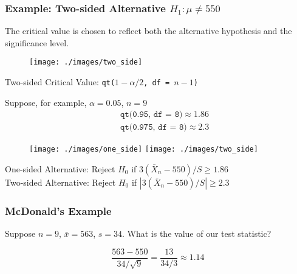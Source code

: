 \documentclass{beamer}
\begin{document}

\begin{frame}
\frametitle{Example: Two-sided Alternative $H_1\colon \mu \neq 550$}
The critical value is chosen to reflect both the alternative hypothesis and the significance level. 
\begin{figure}
\texttt{[image: ./images/two\_side]}
\end{figure}
Two-sided Critical Value: \texttt{qt($1-\alpha/2$, df  = $n-1$)}
\end{frame}

\begin{frame}
Suppose, for example, $\alpha = 0.05$, $n = 9$
	\begin{eqnarray*}
		&&\texttt{qt(0.95, df  = 8)}\approx 1.86\\
		 &&\texttt{qt(0.975, df  = 8)}\approx 2.3
	\end{eqnarray*}
\begin{figure}
\texttt{[image: ./images/one\_side]}
\texttt{[image: ./images/two\_side]}
\end{figure}
One-sided Alternative: Reject $H_0$ if $3(\bar{X}_n - 550)/S \geq 1.86$\\
\vspace{0.5em}
Two-sided Alternative: Reject $H_0$ if $\left|3(\bar{X}_n - 550)/S\right| \geq 2.3$\\

\end{frame}

\begin{frame}
\frametitle{McDonald's Example}
Suppose $n=9$, $\bar{x} = 563$, $s = 34$. What is  the value of our test statistic?

\pause
\vspace{1em}
	$$\frac{563 - 550}{34/\sqrt{9}}= \frac{13}{34/3} \approx 1.14$$


\end{frame}
\end{document}
